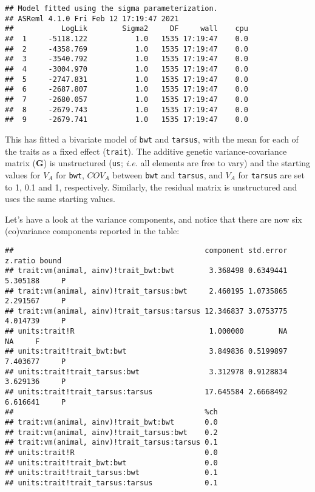 \documentclass[12pt,]{book}
\newenvironment{Shaded}{\begin{snugshade}}{\end{snugshade}}
\newcommand{\KeywordTok}[1]{\textcolor[rgb]{0.13,0.29,0.53}{\textbf{#1}}}
\newcommand{\NormalTok}[1]{#1}
\newcommand{\OperatorTok}[1]{\textcolor[rgb]{0.81,0.36,0.00}{\textbf{#1}}}
\begin{document}
\begin{verbatim}
## Model fitted using the sigma parameterization.
## ASReml 4.1.0 Fri Feb 12 17:19:47 2021
##           LogLik        Sigma2     DF     wall    cpu
##  1     -5118.122           1.0   1535 17:19:47    0.0
##  2     -4358.769           1.0   1535 17:19:47    0.0
##  3     -3540.792           1.0   1535 17:19:47    0.0
##  4     -3004.970           1.0   1535 17:19:47    0.0
##  5     -2747.831           1.0   1535 17:19:47    0.0
##  6     -2687.807           1.0   1535 17:19:47    0.0
##  7     -2680.057           1.0   1535 17:19:47    0.0
##  8     -2679.743           1.0   1535 17:19:47    0.0
##  9     -2679.741           1.0   1535 17:19:47    0.0
\end{verbatim}

This has fitted a bivariate model of \texttt{bwt} and \texttt{tarsus}, with the mean for each of the traits as a fixed effect (\texttt{trait}). The additive genetic variance-covariance matrix (\(\textbf{G}\)) is unstructured (\texttt{us}; \emph{i.e.} all elements are free to vary) and the starting values for \(V_A\) for \texttt{bwt}, \(COV_A\) between \texttt{bwt} and \texttt{tarsus}, and \(V_A\) for \texttt{tarsus} are set to 1, 0.1 and 1, respectively. Similarly, the residual matrix is unstructured and uses the same starting values.

Let's have a look at the variance components, and notice that there are now six (co)variance components reported in the table:

\begin{Shaded}
\end{Shaded}

\begin{verbatim}
##                                            component std.error  z.ratio bound
## trait:vm(animal, ainv)!trait_bwt:bwt        3.368498 0.6349441 5.305188     P
## trait:vm(animal, ainv)!trait_tarsus:bwt     2.460195 1.0735865 2.291567     P
## trait:vm(animal, ainv)!trait_tarsus:tarsus 12.346837 3.0753775 4.014739     P
## units:trait!R                               1.000000        NA       NA     F
## units:trait!trait_bwt:bwt                   3.849836 0.5199897 7.403677     P
## units:trait!trait_tarsus:bwt                3.312978 0.9128834 3.629136     P
## units:trait!trait_tarsus:tarsus            17.645584 2.6668492 6.616641     P
##                                            %ch
## trait:vm(animal, ainv)!trait_bwt:bwt       0.0
## trait:vm(animal, ainv)!trait_tarsus:bwt    0.2
## trait:vm(animal, ainv)!trait_tarsus:tarsus 0.1
## units:trait!R                              0.0
## units:trait!trait_bwt:bwt                  0.0
## units:trait!trait_tarsus:bwt               0.1
## units:trait!trait_tarsus:tarsus            0.1
\end{verbatim}
\end{document}
